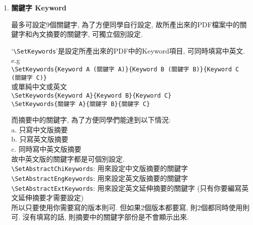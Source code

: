 \begin{enumerate}
{    如果要用的是範例:\\
    \verb|\DisplayOralTemplate|: 顯示 / 使用 口試範例版本.\\
    \verb|\DisplayOralChiTemplate|: 顯示中文範例版本\\
    \verb|\DisplayOralEngTemplate|: 顯示英文範例版本\\
    \verb|\SetCommitteeSize{9}|: 口試委員數量, 要配合\verb|\DisplayOralTemplate|來使用, 至少4位, 最多9位, 預設為9位.\\

    而如果要用的是自己的檔案:\\
    把你的圖片放在`context/oral'下, 之後設定中英文版所對應是哪一個檔案.\\
    就算已啟用`\verb|\DisplayOralImage|', 但沒有填寫圖檔檔名的話, 都不會顯示出來.\\
    (例子用的`example-oral-chi.pdf'和`example-oral-eng.pdf'已放在`context/oral'中)\\
    \verb|\DisplayOralImage|: 設定要顯示圖片\\
    \verb|\SetOralImageChi{example-oral-chi.pdf}|: 設定中文版檔名\\
    \verb|\SetOralImageEng{example-oral-eng.pdf}|: 設定英文版檔名

    雖然沒有限定圖片的格式, 但是推薦使用PDF, 而且是沒法使用SVG.
  } %

  \item
  {
    \textbf{關鍵字 Keyword}

    最多可設定9個關鍵字, 為了方便同學自行設定, 故所產出來的PDF檔案中的關鍵字和內文摘要的關鍵字, 可獨立個別設定.

    `\verb|\SetKeywords|'是設定所產出來的PDF中的Keyword項目, 可同時填寫中英文.
    e.g\\
    \verb|\SetKeywords{Keyword A (關鍵字 A)}{Keyword B (關鍵字 B)}{Keyword C (關鍵字 C)}|\\
    或單純中文或英文\\
    \verb|\SetKeywords{Keyword A}{Keyword B}{Keyword C}|\\
    \verb|\SetKeywords{關鍵字 A}{關鍵字 B}{關鍵字 C}|

    而摘要中的關鍵字, 為了方便同學們能達到以下情況:\\
    a. 只寫中文版摘要\\
    b. 只寫英文版摘要\\
    c. 同時寫中英文版摘要\\
    故中英文版的關鍵字都是可個別設定.\\
    \verb|\SetAbstractChiKeywords|: 用來設定中文版摘要的關鍵字\\
    \verb|\SetAbstractEngKeywords|: 用來設定英文版摘要的關鍵字\\
    \verb|\SetAbstractExtKeywords|: 用來設定英文延伸摘要的關鍵字 (只有你要編寫英文延伸摘要才需要設定)\\
    所以只要使用你需要寫的版本則可. 但如果2個版本都要寫, 則2個都同時使用則可. 沒有填寫的話, 則摘要中的關鍵字部份是不會顯示出來.

}
\end{enumerate}
